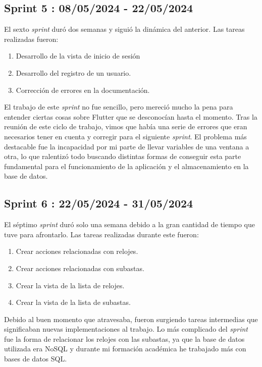 \subsection{Sprint 5 : 08/05/2024 - 22/05/2024}

	El sexto \emph{sprint} duró dos semanas y siguió la dinámica del anterior. Las tareas realizadas fueron:
	\begin{enumerate}
		\item Desarrollo de la vista de inicio de sesión
		\item Desarrollo del registro de un usuario.
		\item Corrección de errores en la documentación.
	\end{enumerate}
	El trabajo de este \emph{sprint} no fue sencillo, pero mereció mucho la pena para entender ciertas cosas sobre Flutter que se desconocían hasta el momento. Tras la reunión de este ciclo de trabajo, vimos que había una serie de errores que eran necesarios tener en cuenta y corregir para el siguiente \emph{sprint}. El problema más destacable fue la incapacidad por mi parte de llevar variables de una ventana a otra, lo que ralentizó todo buscando distintas formas de conseguir esta parte fundamental para el funcionamiento de la aplicación y el almacenamiento en la base de datos.
	
\subsection{Sprint 6 : 22/05/2024 - 31/05/2024}

	El séptimo \emph{sprint} duró solo una semana debido a la gran cantidad de tiempo que tuve para afrontarlo. Las tareas realizadas durante este fueron:
	\begin{enumerate}
		\item Crear acciones relacionadas con relojes.
		\item Crear acciones relacionadas con subastas.
		\item Crear la vista de la lista de relojes.
		\item Crear la vista de la lista de subastas.
	\end{enumerate}
	Debido al buen momento que atravesaba, fueron surgiendo tareas intermedias que significaban nuevas implementaciones al trabajo. Lo más complicado del \emph{sprint} fue la forma de relacionar los relojes con las subastas, ya que la base de datos utilizada era NoSQL y durante mi formación académica he trabajado más con bases de datos SQL.
	
